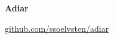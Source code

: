 \begin{frame}{} %
  \pause

  \begin{center}
    \vspace{8pt}
    
    {\Huge \textbf{Adiar}}

    \vspace{12pt}
    
    \textcolor{gray}{\small
      \href{http://github.com/ssoelvsten/adiar}{github.com/ssoelvsten/adiar}
    }
  \end{center}
\end{frame}